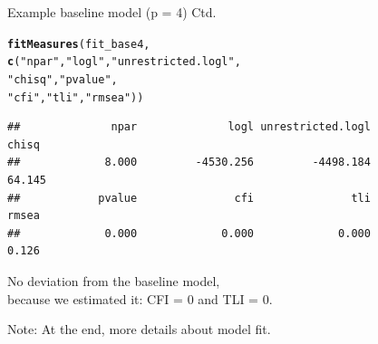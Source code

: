 \documentclass[10pt]{beamer}\usepackage[]{graphicx}\usepackage[]{xcolor}
\makeatletter
\newcommand{\hlstr}[1]{\textcolor[rgb]{0.192,0.494,0.8}{#1}}%
\newcommand{\hlstd}[1]{\textcolor[rgb]{0.345,0.345,0.345}{#1}}%
\newcommand{\hlkwd}[1]{\textcolor[rgb]{0.737,0.353,0.396}{\textbf{#1}}}%
\newenvironment{kframe}{%
 \def\at@end@of@kframe{}%
 \ifinner\ifhmode%
  \def\at@end@of@kframe{\end{minipage}}%
  \begin{minipage}{\columnwidth}%
 \fi\fi%
 \def\FrameCommand##1{\hskip\@totalleftmargin \hskip-\fboxsep
 \colorbox{shadecolor}{##1}\hskip-\fboxsep
     \hskip-\linewidth \hskip-\@totalleftmargin \hskip\columnwidth}%
 \MakeFramed {\advance\hsize-\width
   \@totalleftmargin\z@ \linewidth\hsize
   \@setminipage}}%
 {\par\unskip\endMakeFramed%
 \at@end@of@kframe}
\newenvironment{knitrout}{}{} %
\makeatother
\begin{document}
\begin{frame}[fragile]{Example baseline model (p = 4) Ctd.}

\begin{knitrout}
\color{fgcolor}\begin{kframe}
\begin{alltt}
\hlkwd{fitMeasures}\hlstd{(fit_base4,}
            \hlkwd{c}\hlstd{(}\hlstr{"npar"}\hlstd{,} \hlstr{"logl"}\hlstd{,} \hlstr{"unrestricted.logl"}\hlstd{,}
              \hlstr{"chisq"}\hlstd{,} \hlstr{"pvalue"}\hlstd{,}
              \hlstr{"cfi"}\hlstd{,} \hlstr{"tli"}\hlstd{,} \hlstr{"rmsea"}\hlstd{))}
\end{alltt}
\begin{verbatim}
##              npar              logl unrestricted.logl             chisq 
##             8.000         -4530.256         -4498.184            64.145 
##            pvalue               cfi               tli             rmsea 
##             0.000             0.000             0.000             0.126
\end{verbatim}
\end{kframe}
\end{knitrout}

\vspace{5mm}

No deviation from the baseline model, \\
because we estimated it: CFI = 0 and TLI = 0.

\vspace{5mm}

Note: At the end, more details about model fit.

\end{frame}
%
\end{document}
